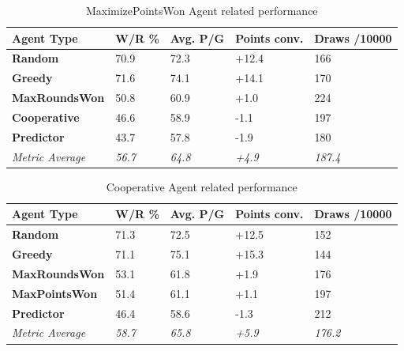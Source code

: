 \documentclass[sigconf]{acmart}
\begin{document}
\begin{table}[H]
  \fontsize{11}{13}\selectfont %
  \begin{tabular}{@{}p{2.9cm}p{1cm}p{1cm}p{1.2cm}p{1.2cm}@{}}
    \toprule
    Agent Type & \textbf{W/R \%} & \textbf{Avg. P/G} & \textbf{Points conv.} & \textbf{Draws /10000}\\
    \midrule
    \textbf{Random} & 70.9 & 72.3 & +12.4 & 166\\
    \textbf{Greedy} & 71.6 & 74.1 & +14.1 & 170\\
    \textbf{MaxRoundsWon} & 50.8 & 60.9 & +1.0 & 224\\
    \textbf{Cooperative} & 46.6 & 58.9 & -1.1 & 197\\
    \textbf{Predictor} & 43.7 & 57.8 & -1.9 & 180\\
    \midrule
    \textit{Metric Average} & \textit{56.7} & \textit{64.8} & \textit{+4.9} & \textit{187.4}\\
    \bottomrule
  \end{tabular}
  \vspace{2mm} %
  \caption{MaximizePointsWon Agent related performance}
  \label{tab:maxpointswon}
\end{table}

\begin{table}[H]
  \fontsize{11}{13}\selectfont %
  \begin{tabular}{@{}p{2.9cm}p{1cm}p{1cm}p{1.2cm}p{1.2cm}@{}}
    \toprule
    Agent Type & \textbf{W/R \%} & \textbf{Avg. P/G} & \textbf{Points conv.} & \textbf{Draws /10000}\\
    \midrule
    \textbf{Random} & 71.3 & 72.5 & +12.5 & 152\\
    \textbf{Greedy} & 71.1 & 75.1 & +15.3 & 144\\
    \textbf{MaxRoundsWon} & 53.1 & 61.8 & +1.9 & 176\\
    \textbf{MaxPointsWon} & 51.4 & 61.1 & +1.1 & 197\\
    \textbf{Predictor} & 46.4 & 58.6 & -1.3 & 212\\
    \midrule
    \textit{Metric Average} & \textit{58.7} & \textit{65.8} & \textit{+5.9} & \textit{176.2}\\
    \bottomrule
  \end{tabular}
  \vspace{2mm} %
  \caption{Cooperative Agent related performance}
  \label{tab:cooperative}
\end{table}
\end{document}
